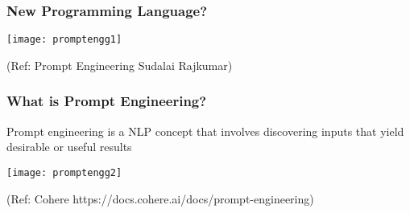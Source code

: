 






\begin{frame}[fragile]\frametitle{New Programming Language?}

\begin{center}
\texttt{[image: promptengg1]}

{\tiny (Ref: Prompt Engineering Sudalai Rajkumar)}

\end{center}				

\end{frame}



\begin{frame}[fragile]\frametitle{What is Prompt Engineering?}

Prompt engineering is a NLP concept that involves discovering inputs that yield desirable or useful results


\begin{center}
\texttt{[image: promptengg2]}

{\tiny (Ref: Cohere https://docs.cohere.ai/docs/prompt-engineering)}

\end{center}				
			
			

\end{frame}



